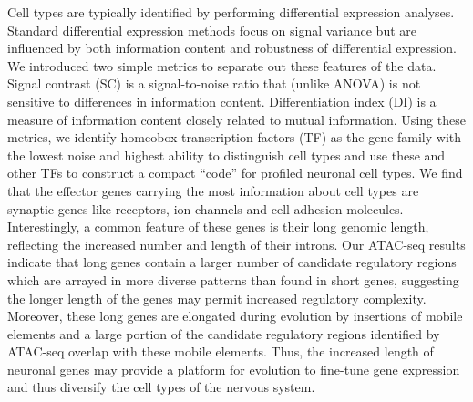 Cell types are typically identified by performing differential expression analyses. Standard differential expression methods focus on signal variance but are influenced by both information content and robustness of differential expression. We introduced two simple metrics to separate out these features of the data. Signal contrast (SC) is a signal-to-noise ratio that (unlike ANOVA) is not sensitive to differences in information content. Differentiation index (DI) is a measure of information content closely related to mutual information. Using these metrics, we identify homeobox transcription factors (TF) as the gene family with the lowest noise and highest ability to distinguish cell types and use these and other TFs to construct a compact “code” for profiled neuronal cell types. We find that the effector genes carrying the most information about cell types are synaptic genes like receptors, ion channels and cell adhesion molecules. Interestingly, a common feature of these genes is their long genomic length, reflecting the increased number and length of their introns. 
Our ATAC-seq results indicate that long genes contain a larger number of candidate regulatory regions which are arrayed in more diverse patterns than found in short genes, suggesting the longer length of the genes may permit increased regulatory complexity.
Moreover, these long genes are elongated during evolution by insertions of mobile elements and a large portion of the candidate regulatory regions identified by ATAC-seq overlap with these mobile elements. Thus, the increased length of neuronal genes may provide a platform for evolution to fine-tune gene expression and thus diversify the cell types of the nervous system.
